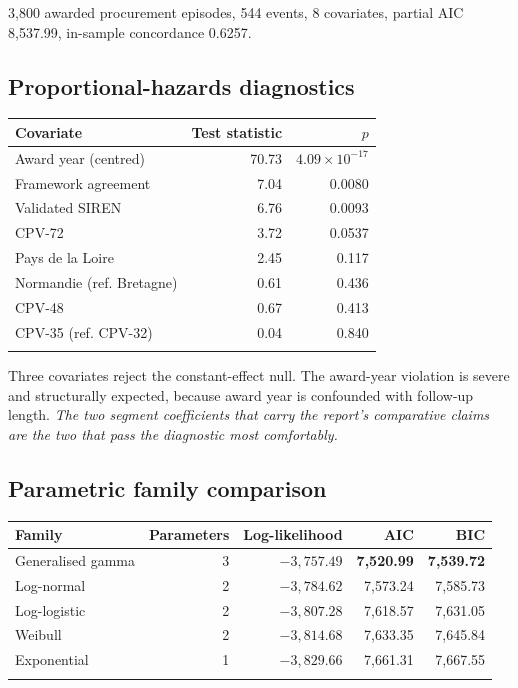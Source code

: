 3,800 awarded procurement episodes, 544 events, 8 covariates, partial AIC 8,537.99, in-sample concordance 0.6257.

\subsection*{Proportional-hazards diagnostics}

\begin{longtable}[]{@{}>{\raggedright\arraybackslash}p{6.5cm}rr@{}}
\toprule\noalign{}
Covariate & Test statistic & $p$ \\
\midrule\noalign{}
\endhead
Award year (centred) & 70.73 & $4.09\times 10^{-17}$ \\
Framework agreement & 7.04 & 0.0080 \\
Validated SIREN & 6.76 & 0.0093 \\
CPV-72 & 3.72 & 0.0537 \\
Pays de la Loire & 2.45 & 0.117 \\
Normandie (ref. Bretagne) & 0.61 & 0.436 \\
CPV-48 & 0.67 & 0.413 \\
CPV-35 (ref. CPV-32) & 0.04 & 0.840 \\
\bottomrule\noalign{}
\end{longtable}

Three covariates reject the constant-effect null. The award-year violation is severe and structurally
expected, because award year is confounded with follow-up length. \emph{The two segment coefficients that
carry the report's comparative claims are the two that pass the diagnostic most comfortably.}

\subsection*{Parametric family comparison}

\begin{longtable}[]{@{}lrrrr@{}}
\toprule\noalign{}
Family & Parameters & Log-likelihood & AIC & BIC \\
\midrule\noalign{}
\endhead
Generalised gamma & 3 & $-3{,}757.49$ & \textbf{7,520.99} & \textbf{7,539.72} \\
Log-normal & 2 & $-3{,}784.62$ & 7,573.24 & 7,585.73 \\
Log-logistic & 2 & $-3{,}807.28$ & 7,618.57 & 7,631.05 \\
Weibull & 2 & $-3{,}814.68$ & 7,633.35 & 7,645.84 \\
Exponential & 1 & $-3{,}829.66$ & 7,661.31 & 7,667.55 \\
\bottomrule\noalign{}
\end{longtable}

